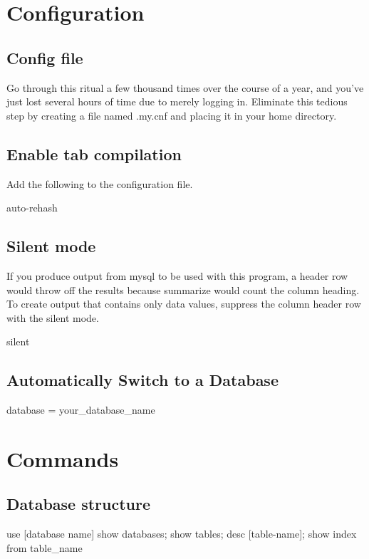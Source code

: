 \section{Configuration}
\subsection{Config file}
Go through this ritual a few thousand times over the course of a year, and you've just lost several hours of time due to merely logging in. Eliminate this tedious step by creating a file named .my.cnf and placing it in your home directory.

\subsection {Enable tab compilation}
Add the following to the configuration file.

\begin{sqlcode}
auto-rehash
\end{sqlcode}
\subsection {Silent mode}
If you produce output from mysql to be used with this program, a header row would throw off the results because summarize would count the column heading. To create output that contains only data values, suppress the column header row with the silent mode.

\begin{sqlcode}
silent
\end{sqlcode}

\subsection{Automatically Switch to a Database}
\begin{sqlcode}
database = your\_database\_name
\end{sqlcode}
\section{Commands}
\subsection{Database structure}
\begin{sqlcode}
use [database name]
show databases;
show tables;
desc [table-name];
show index from table_name
\end{sqlcode}
